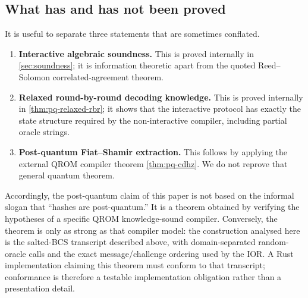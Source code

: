 \subsection{What has and has not been proved}
\label{sec:pq-scope}

It is useful to separate three statements that are sometimes conflated.

\begin{enumerate}[label=(\arabic*),leftmargin=*]
  \item \textbf{Interactive algebraic soundness.}  This is proved internally in \cref{sec:soundness}; it is information theoretic apart from the quoted Reed--Solomon correlated-agreement theorem.
  \item \textbf{Relaxed round-by-round decoding knowledge.}  This is proved internally in \cref{thm:pq-relaxed-rbr}; it shows that the interactive protocol has exactly the state structure required by the non-interactive compiler, including partial oracle strings.
  \item \textbf{Post-quantum Fiat--Shamir extraction.}  This follows by applying the external QROM compiler theorem \cref{thm:pq-cdhz}.  We do not reprove that general quantum theorem.
\end{enumerate}

Accordingly, the post-quantum claim of this paper is not based on the informal slogan that ``hashes are post-quantum.''  It is a theorem obtained by verifying the hypotheses of a specific QROM knowledge-sound compiler.  Conversely, the theorem is only as strong as that compiler model: the construction analysed here is the salted-BCS transcript described above, with domain-separated random-oracle calls and the exact message/challenge ordering used by the IOR.  A Rust implementation claiming this theorem must conform to that transcript; conformance is therefore a testable implementation obligation rather than a presentation detail.
